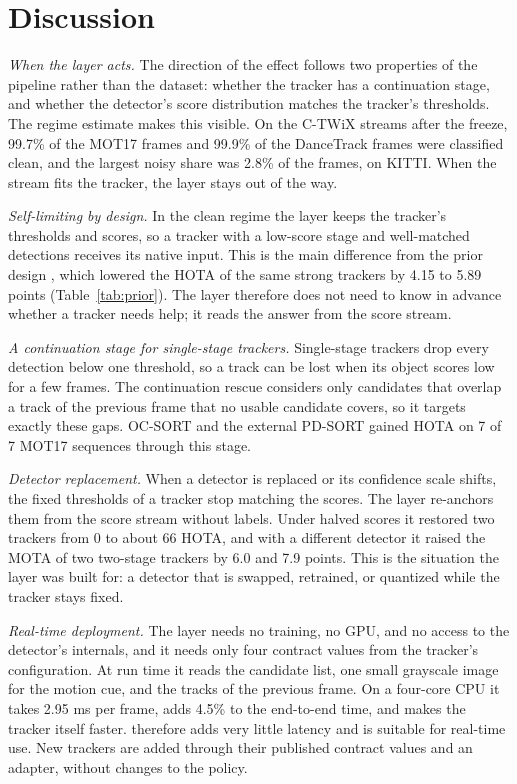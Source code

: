 \section{Discussion}\label{sec:discussion}

\emph{When the layer acts.} The direction of the effect follows two
properties of the pipeline rather than the dataset: whether the tracker has a
continuation stage, and whether the detector's score distribution matches the
tracker's thresholds. The regime estimate makes this visible. On the C-TWiX
streams after the freeze, 99.7\% of the MOT17 frames and 99.9\% of the
DanceTrack frames were classified clean, and the largest noisy share was 2.8\%
of the frames, on KITTI. When the stream fits the tracker, the layer stays out
of the way.

\emph{Self-limiting by design.} In the clean regime the layer keeps the
tracker's thresholds and scores, so a tracker with a low-score stage and
well-matched detections receives its native input. This is the main
difference from the prior design \aob{}, which lowered the HOTA of the same strong
trackers by 4.15 to 5.89 points (Table~\ref{tab:prior}). The layer therefore does not
need to know in advance whether a tracker needs help; it reads the answer from
the score stream.

\emph{A continuation stage for single-stage trackers.} Single-stage trackers
drop every detection below one threshold, so a track can be lost when its
object scores low for a few frames. The continuation rescue considers only
candidates that overlap a track of the previous frame that no usable candidate
covers, so it targets exactly these gaps. OC-SORT and the external PD-SORT
gained HOTA on 7 of 7 MOT17 sequences through this stage.

\emph{Detector replacement.} When a detector is replaced or its confidence
scale shifts, the fixed thresholds of a tracker stop matching the scores. The
layer re-anchors them from the score stream without labels. Under halved
scores it restored two trackers from 0 to about 66 HOTA, and with a different
detector it raised the MOTA of two two-stage trackers by 6.0 and 7.9 points.
This is the situation the layer was built for: a detector that is swapped,
retrained, or quantized while the tracker stays fixed.

\emph{Real-time deployment.} The layer needs no training, no GPU, and no
access to the detector's internals, and it needs only four contract values
from the tracker's configuration. At run time it reads the candidate list, one
small grayscale image for the motion cue, and the tracks of the previous
frame. On a four-core CPU it takes 2.95 ms per frame, adds 4.5\% to the end-to-end time, and makes the tracker
itself faster. \scl{} therefore adds very little latency and is
suitable for real-time use. New trackers are added through their published
contract values and an adapter, without changes to the policy.
